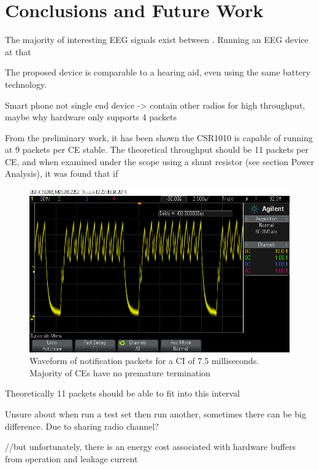 \documentclass[]{article}
\begin{document}
\clearpage 
\section{Conclusions and Future Work}
The majority of interesting \ac{EEG} signals exist between . Running an \ac{EEG} device at that 

The proposed device is comparable to a hearing aid, even using the same battery technology. 

Smart phone not single end device -> contain other radios for high throughput, maybe why hardware only supports 4 packets


From the preliminary work, it has been shown the CSR1010 is capable of running at 9 packets per \ac{CE} stable. The theoretical throughput should be 11 packets per \ac{CE}, and when examined under the scope using a shunt resistor (see section Power Analysis), it was found that if 



\begin{figure}[htb]
	\begin{center}
		\includegraphics[width = \textwidth]{9pckts}
	\end{center}
	\caption{Waveform of notification packets for a \ac{CI} of 7.5 milliseconds. Majority of \ac{CE}s have no premature termination}
	\label{fig:9pckts}
\end{figure}

Theoretically 11 packets should be able to fit into this interval 

Unsure about when run a test set then run another, sometimes there can be big difference. Due to sharing radio channel?

//but unfortunately, there is an energy cost associated with hardware buffers from operation and leakage current
\end{document}
